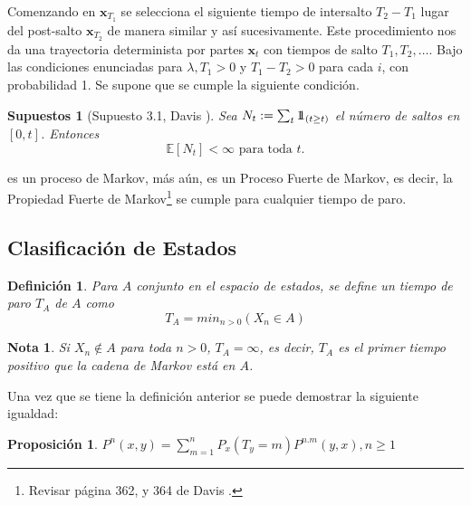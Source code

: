 \documentclass{article}
\newtheorem{Def}{Definición}[section]
\newtheorem{Note}{Nota}[section]
\newtheorem{Prop}{Proposición}[section]
\newtheorem{Sup}{Supuestos}[section]
\newcommand{\esp}{\mathbb{E}}
\newcommand{\indora}{\mbox{$1$\hspace{-0.8ex}$1$}}
\numberwithin{equation}{section}
\begin{document}
Comenzando en $\mathbf{x}_{T_{1}}$ se selecciona el siguiente tiempo de intersalto $T_{2}-T_{1}$ lugar del post-salto $\mathbf{x}_{T_{2}}$ de manera similar y as\'i sucesivamente. Este procedimiento nos da una trayectoria determinista por partes $\mathbf{x}_{t}$ con tiempos de salto $T_{1},T_{2},\ldots$. Bajo las condiciones enunciadas para $\lambda,T_{1}>0$  y $T_{1}-T_{2}>0$ para cada $i$, con probabilidad 1. Se supone que se cumple la siguiente condici\'on.

\begin{Sup}[Supuesto 3.1, Davis \cite{Davis}]\label{Sup3.1.Davis}
Sea $N_{t}:=\sum_{t}\indora_{\left(t\geq t\right)}$ el n\'umero de saltos en $\left[0,t\right]$. Entonces
\begin{equation}
\esp\left[N_{t}\right]<\infty\textrm{ para toda }t.
\end{equation}
\end{Sup}

es un proceso de Markov, m\'as a\'un, es un Proceso Fuerte de Markov, es decir, la Propiedad Fuerte de Markov\footnote{Revisar p\'agina 362, y 364 de Davis \cite{Davis}.} se cumple para cualquier tiempo de paro.

\subsection*{Clasificaci\'on de Estados}

\begin{Def}
Para $A$ conjunto en el espacio de estados, se define un tiempo de paro $T_{A}$ de $A$ como
\begin{equation}
T_{A}=min_{n>0}\left(X_{n}\in A\right)
\end{equation}
\end{Def}

\begin{Note}
Si $X_{n}\notin A$ para toda $n>0$, $T_{A}=\infty$, es decir,  $T_{A}$ es el primer tiempo positivo que la cadena de Markov est\'a en $A$.
\end{Note}

Una vez que se tiene la definici\'on anterior se puede demostrar la siguiente igualdad:

\begin{Prop}
$P^{n}\left(x,y\right)=\sum_{m=1}^{n}P_{x}\left(T_{y}=m\right)P^{n.m}\left(y,x\right), n\geq1$
\end{Prop}
\medskip
\end{document}
